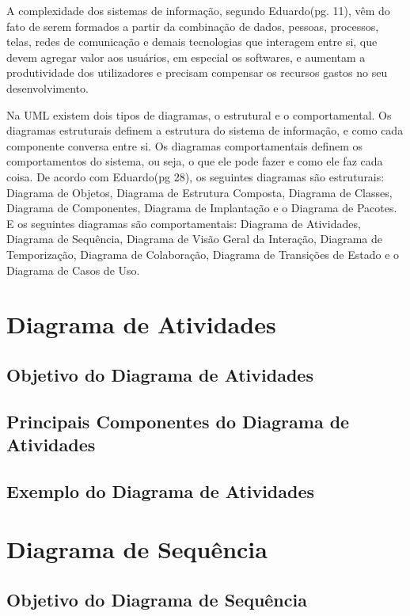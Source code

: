 \documentclass[12pt,openright,oneside,a4paper,
	chapter=TITLE,
	section=TITLE,
	english,brazil]{abntex2}
\begin{document}
A complexidade dos sistemas de informação, segundo Eduardo(pg. 11), vêm do fato de serem formados a partir da combinação de dados, pessoas, processos, telas, redes de comunicação e demais tecnologias que interagem entre si, que devem agregar valor aos usuários, em especial os softwares, e aumentam a produtividade dos utilizadores e precisam compensar os recursos gastos no seu desenvolvimento.

Na UML existem dois tipos de diagramas, o estrutural e o comportamental. Os diagramas estruturais definem a estrutura do sistema de informação, e como cada componente conversa entre si. Os diagramas comportamentais definem os comportamentos do sistema, ou seja, o que ele pode fazer e como ele faz cada coisa. De acordo com Eduardo(pg 28), os seguintes diagramas são estruturais: Diagrama de Objetos, Diagrama de Estrutura Composta, Diagrama de Classes, Diagrama de Componentes, Diagrama de Implantação e o Diagrama de Pacotes. E os seguintes diagramas são comportamentais: Diagrama de Atividades, Diagrama de Sequência, Diagrama de Visão Geral da Interação, Diagrama de Temporização, Diagrama de Colaboração, Diagrama de Transições de Estado e o Diagrama de Casos de Uso.

\chapter{Diagrama de Atividades}

\section{Objetivo do Diagrama de Atividades}

\section{Principais Componentes do Diagrama de Atividades}

\section{Exemplo do Diagrama de Atividades}

\chapter{Diagrama de Sequência}

\section{Objetivo do Diagrama de Sequência}
\end{document}
